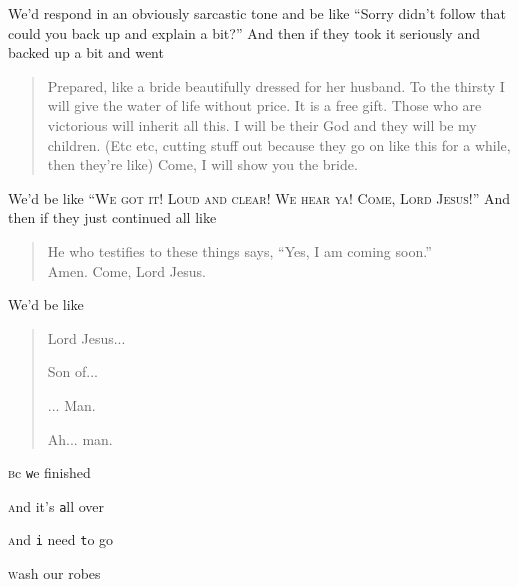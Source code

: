 {{                We'd respond in an obviously sarcastic tone and be like ``Sorry didn't follow that could you back up and explain a bit?'' And then if they took it seriously and backed up a bit and went

                \begin{quote}
                Prepared, like a bride beautifully dressed for her husband.
                To the thirsty I will give the water of life without price.
                It is a free gift.
                Those who are victorious will inherit all this.
                I will be their God and they will be my children.
                (Etc etc, cutting stuff out because they go on like this for a while, then they're like)
                Come, I will show you the bride.
                \end{quote}

                We'd be like ``\textsc{We got it! Loud and clear! We hear ya! Come, Lord Jesus!}''
                And then if they just continued all like

                \begin{quote}
                He who testifies to these things says, ``Yes, I am coming soon.''\\
                Amen. Come, Lord Jesus.
                \end{quote}

                We'd be like

                \begin{quote}
                \centering
                Lord Jesus...

                Son of...

                ... Man.

                Ah... man.
                \end{quote}

                \textsc{b}c \texttt{w}e finished

                \textsc{a}nd it's \texttt{a}ll over

                \textsc{a}nd \texttt{i} need \texttt{t}o go

                \textsc{w}ash our robes

                \begin{quote}
                \centering


\end{quote}}}
